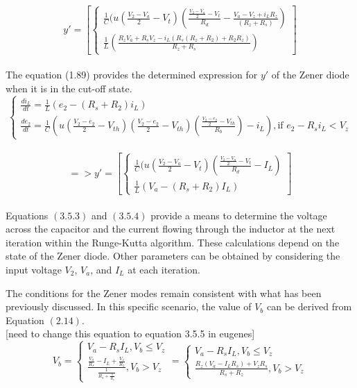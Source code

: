 \begin{equation}
    y'=[\begin{cases}
        \frac{1}{C}(u(\frac{V_2-V_a}{2}-V_t)(\frac{\frac{V_2-V_a}{2}-V_t}{R_d}-\frac{V_a-V_z+i_LR_z}{(R_z+R_s)})\\
        \frac{1}{L}(\frac{R_zV_a+R_sV_z-i_L(R_s(R_z+R_2)+R_2R_z)}{R_z+R_s})
    \end{cases}]
\end{equation}\\

The equation (1.89) provides the determined expression for $y'$ of the Zener diode when it is in the cut-off state.\\

\begin{equation}
    \begin{cases}
        \frac{di_L}{dt}=\frac{1}{L}(e_2-(R_s+R_2)i_L)\\
        \frac{de_2}{dt}=\frac{1}{C}\left(u\left(\frac{V_2-e_2}{2}-V_{th}\right)\left(\frac{V_2-e_2}{2}-V_{th}\right)\left(\frac{\frac{V_2-e_2}{2}-V_{th}}{R_b}\right)-i_L\right), \text{if } e_2-R_si_L<V_z
    \end{cases}
\end{equation}\\

\begin{equation}
    =>y'=[\begin{cases}
        \frac{1}{C}(u(\frac{V_2-V_a}{2}-V_t)(\frac{\frac{V_2-V_a}{2}-V_t}{R_d}-I_L)\\
        \frac{1}{L}(V_a-(R_s+R_2)I_L)
    \end{cases}]
\end{equation}\\

Equations $(3.5.3)$ and $(3.5.4)$ provide a means to determine the voltage across the capacitor and the current flowing through the inductor at the next iteration within the Runge-Kutta algorithm. These calculations depend on the state of the Zener diode. Other parameters can be obtained by considering the input voltage $V_2$, $V_a$, and $I_L$ at each iteration.

The conditions for the Zener modes remain consistent with what has been previously discussed. In this specific scenario, the value of $V_b$ can be derived from Equation $(2.14)$.\\


[need to change this equation to equation 3.5.5 in eugenes]
\begin{equation}
    V_b=\begin{cases}
        V_a-R_sI_L, V_b \leq V_z\\
        \frac{\frac{V_a}{R_s}-I_L+\frac{V_z}{R_z}}{\frac{1}{R_s+\frac{1}{R_z}}}, V_b>V_z
    \end{cases}=\begin{cases}
        V_a-R_sI_L, V_b \leq V_z\\
        \frac{R_z(V_a-I_LR_s)+V_zR_s}{R_s+R_z}, V_b>V_z
    \end{cases} 
\end{equation}\\

